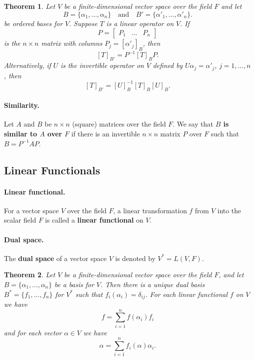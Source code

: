 \documentclass{article}
\newtheorem{theorem}{Theorem}[section]
\begin{document}
\begin{theorem}
  Let $V$ be a finite-dimensional vector space over the field $F$ and let \[
    B = \{\alpha_1, \ldots, \alpha_n\}\quad\text{and}\quad
    B' = \{\alpha'_1, \ldots, \alpha'_n\}.
  \] be ordered bases for $V$. Suppose $T$ is a linear operator on $V$. If \[
    P = \begin{bmatrix}
      P_1 & \ldots & P_n
    \end{bmatrix}
  \] is the $n \times n$ matrix with columns $P_j = [\alpha'_j]_B$, then \[
    [T]_{B'} = P^{-1}[T]_BP.
  \] Alternatively, if $U$ is the invertible operator on $V$ defined by
  $U\alpha_j = \alpha'_j$, $j = 1, \ldots, n$, then \[
    [T]_{B'} = [U]^{-1}_B [T]_B [U]_B.
  \]
\end{theorem}

\paragraph{Similarity.} Let $A$ and $B$ be $n \times n$ (square) matrices over
the field $F$. We say that \textbf{$B$ is similar to $A$ over $F$} if there is
an invertible $n \times n$ matrix $P$ over $F$ such that $B = P^{-1}AP$.

\subsection{Linear Functionals}

\paragraph{Linear functional.} For a vector space $V$ over the field $F$, a
linear transformation $f$ from $V$ into the scalar field $F$ is called a
\textbf{linear functional} on $V$.

\paragraph{Dual space.} The \textbf{dual space} of a vector space $V$ is denoted
by $V^* = L(V, F)$.

\begin{theorem}
  Let $V$ be a finite-dimensional vector space over the field $F$, and let $B =
  \{\alpha_1, \ldots, \alpha_n\}$ be a basis for $V$. Then there is a unique
  dual basis $B^* = \{f_1, \ldots, f_n\}$ for $V^*$ such that $f_i(\alpha_i) =
  \delta_{ij}$. For each linear functional $f$ on $V$ we have \[
    f = \sum_{i=1}^n f(\alpha_i)f_i
  \] and for each vector $\alpha \in V$ we have \[
    \alpha = \sum_{i=1}^n f_i(\alpha)\alpha_i.
  \]
\end{theorem}
\end{document}
